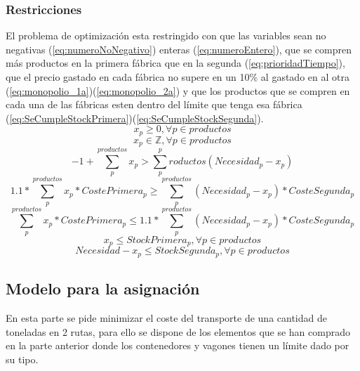 \documentclass[11pt,spanish]{article}
\begin{document}
			\subsubsection{Restricciones}
			El problema de optimización esta restringido con que las variables sean no negativas (\ref{eq:numeroNoNegativo}) enteras (\ref{eq:numeroEntero}), que se compren más productos en la primera fábrica que en la segunda (\ref{eq:prioridadTiempo}), que el precio gastado en cada fábrica no supere en un 10\% al gastado en al otra (\ref{eq:monopolio_1a})(\ref{eq:monopolio_2a}) y que los productos que se compren en cada una de las fábricas esten dentro del límite que tenga esa fábrica (\ref{eq:SeCumpleStockPrimera})(\ref{eq:SeCumpleStockSegunda}).
			\begin{equation}
				\label{eq:numeroNoNegativo}
				x_p \geq 0, \forall p \in productos
			\end{equation}
			\begin{equation}
				\label{eq:numeroEntero}
				x_p \in \mathbb{Z} , \forall p \in productos
			\end{equation}
			\begin{equation}
				\label{eq:prioridadTiempo}
				-1 + \sum_p^{productos} x_p > \sum_p^productos (Necesidad_p - x_p)
			\end{equation}
			\begin{equation}
				\label{eq:monopolio_1a}
				1.1*\sum_p^{productos} x_p*CostePrimera_p \geq \sum_p^{productos} (Necesidad_p - x_p)*CosteSegunda_p
			\end{equation}
			\begin{equation}
				\label{eq:monopolio_2a}
				\sum_p^{productos} x_p*CostePrimera_p \leq 1.1*\sum_p^{productos} (Necesidad_p - x_p)*CosteSegunda_p
			\end{equation}
			\begin{equation}
				\label{eq:SeCumpleStockPrimera}
				x_p \leq StockPrimera_p, \forall p \in productos
			\end{equation}
			\begin{equation}
				\label{eq:SeCumpleStockSegunda}
				Necesidad - x_p \leq StockSegunda_p, \forall p \in productos
			\end{equation}
		\subsection{Modelo para la asignación}
		En esta parte se pide minimizar el coste del transporte de una cantidad de toneladas en 2 rutas, para ello se dispone de los elementos que se han comprado en la parte anterior donde los contenedores y vagones tienen un límite dado por su tipo.
\end{document}
